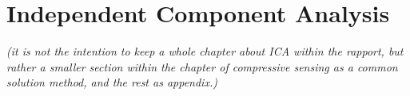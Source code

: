\section{Independent Component Analysis}\label{sec:ICA}
\textit{(it is not the intention to keep a whole chapter about ICA within the rapport, but rather a smaller section within the chapter of compressive sensing as a common solution method, and the rest as appendix.)}\\ \\ 

